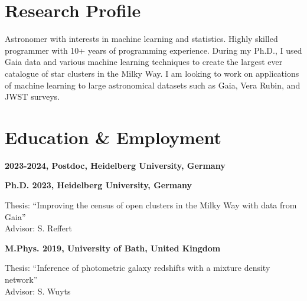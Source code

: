\documentclass[12pt, letterpaper]{hunt-cv}
\begin{document}
\thispagestyle{plain}  %

\cvTitle

\section*{Research Profile}

Astronomer with interests in machine learning and statistics. Highly skilled programmer with 10+ years of programming experience. During my Ph.D., I used Gaia data and various machine learning techniques to create the largest ever catalogue of star clusters in the Milky Way. I am looking to work on applications of machine learning to large astronomical datasets such as Gaia, Vera Rubin, and JWST surveys.






\section*{Education \& Employment}

\textbf{2023-2024, Postdoc, Heidelberg University, Germany}
\vspace{0.2cm}

\textbf{Ph.D. 2023, Heidelberg University, Germany}
\begin{addmargin}[2em]{0em}
    Thesis: ``Improving the census of open clusters in the Milky Way with data from Gaia''\\
    Advisor: S. Reffert
\end{addmargin}
\vspace{0.2cm}

\textbf{M.Phys. 2019, University of Bath, United Kingdom}
\begin{addmargin}[2em]{0em}
    Thesis: ``Inference of photometric galaxy redshifts with a mixture density network''\\
    Advisor: S. Wuyts
\end{addmargin}
\end{document}
